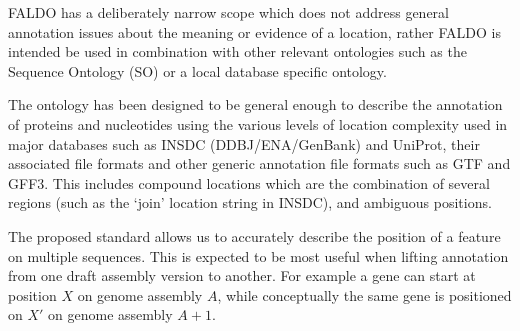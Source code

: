 FALDO has a deliberately narrow scope which does not address general annotation
issues about the meaning or evidence of a location, rather FALDO is intended be
used in combination with other relevant ontologies such as the Sequence Ontology
(SO) \cite{SequenceOntology2005} or a local database specific ontology.

The ontology has been designed to be general enough to describe the annotation
of proteins and nucleotides using the various levels of location complexity used
in major databases such as INSDC (DDBJ/ENA/GenBank) and UniProt, their
associated file formats and other generic annotation file formats such as GTF
and GFF3. This includes compound locations which are the combination of
several regions (such as the `join' location string in INSDC), and ambiguous
positions.

The proposed standard allows us to accurately describe the position of a feature on multiple sequences.
This is expected to be most useful when lifting annotation from one draft assembly version to another.
For example a gene can start at position $X$ on genome assembly $A$,
while conceptually the same gene is positioned on $X'$ on genome assembly $A+1$.

